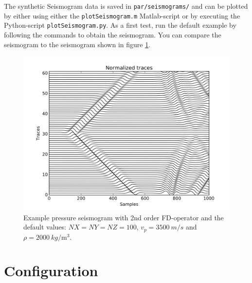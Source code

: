 \documentclass[pdftex,a4paper,parskip,listof=totoc,bibliography=totoc,onehalfspacing,12pt]{scrreprt}
\newcommand{\shellcmd}[1]{\indent\indent\texttt{#1}}	%
\begin{document}
The synthetic Seismogram data is saved in \shellcmd{par/seismograms/} and can be plotted by either using either the \shellcmd{plotSeismogram.m} Matlab-script or by executing the Python-script \shellcmd{plotSeismogram.py}.
As a first test, run the default example by following the commands to obtain the seismogram. You can compare the seismogram to the seismogram shown in figure \ref{fig:Seismogram}.

\begin{figure}[h!]
\centering
	\includegraphics[width = .8\textwidth]{images/Test_Seismogram.png}
	\caption[Example pressure seismogram.]{Example pressure seismogram with 2nd order FD-operator and the default values: $NX=NY=NZ=100$, $v_p=\SI{3500}{m\per s}$ and $\rho = \SI{2000}{kg\per\cubic\metre}$.}\label{fig:Seismogram}
\end{figure}

\section{Configuration}\label{sec:config}
\end{document}
